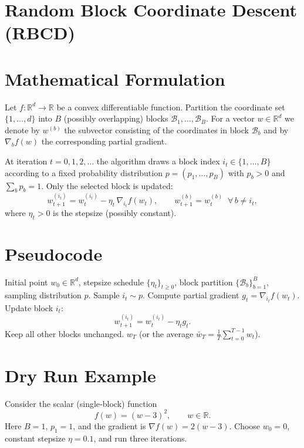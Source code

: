 \documentclass{article}
\newcommand{\R}{\mathbb{R}}
\begin{document}
\section*{Random Block Coordinate Descent (RBCD)}

\section*{Mathematical Formulation}
Let $f:\R^{d}\rightarrow \R$ be a convex differentiable function.
Partition the coordinate set $\{1,\dots,d\}$ into $B$ (possibly overlapping) blocks
$\mathcal{B}_{1},\dots ,\mathcal{B}_{B}$.
For a vector $w\in\R^{d}$ we denote by $w^{(b)}$ the subvector consisting of the
coordinates in block $\mathcal{B}_{b}$ and by $\nabla_{b}f(w)$ the corresponding
partial gradient.

At iteration $t=0,1,2,\dots$ the algorithm draws a block index $i_{t}\in\{1,\dots ,B\}$
according to a fixed probability distribution $p=(p_{1},\dots ,p_{B})$
with $p_{b}>0$ and $\sum_{b}p_{b}=1$.
Only the selected block is updated:
\[
w_{t+1}^{(i_{t})}=w_{t}^{(i_{t})}-\eta_{t}\,\nabla_{i_{t}}f(w_{t}),\qquad
w_{t+1}^{(b)}=w_{t}^{(b)}\;\;\forall\,b\neq i_{t},
\tag{1}
\]
where $\eta_{t}>0$ is the stepsize (possibly constant).

\section*{Pseudocode}
\begin{algorithm}[H]
\caption{Random Block Coordinate Descent}
\begin{algorithmic}[1]
\Require Initial point $w_{0}\in\R^{d}$, stepsize schedule $\{\eta_{t}\}_{t\ge0}$,
block partition $\{\mathcal{B}_{b}\}_{b=1}^{B}$, sampling distribution $p$.
    \State Sample $i_{t}\sim p$.
    \State Compute partial gradient $\displaystyle g_{t}= \nabla_{i_{t}}f(w_{t})$.
    \State Update block $i_{t}$:
    \[
    w_{t+1}^{(i_{t})}= w_{t}^{(i_{t})}-\eta_{t} g_{t}.
    \]
    \State Keep all other blocks unchanged.
\EndFor
\State \Return $w_{T}$ (or the average $\bar w_{T}= \frac1T\sum_{t=0}^{T-1}w_{t}$).
\end{algorithmic}
\end{algorithm}

\section*{Dry Run Example}
Consider the scalar (single‑block) function
\[
f(w)=(w-3)^{2},\qquad w\in\R .
\]
Here $B=1$, $p_{1}=1$, and the gradient is $\nabla f(w)=2(w-3)$.
Choose $w_{0}=0$, constant stepsize $\eta=0.1$, and run three iterations.
\end{document}

